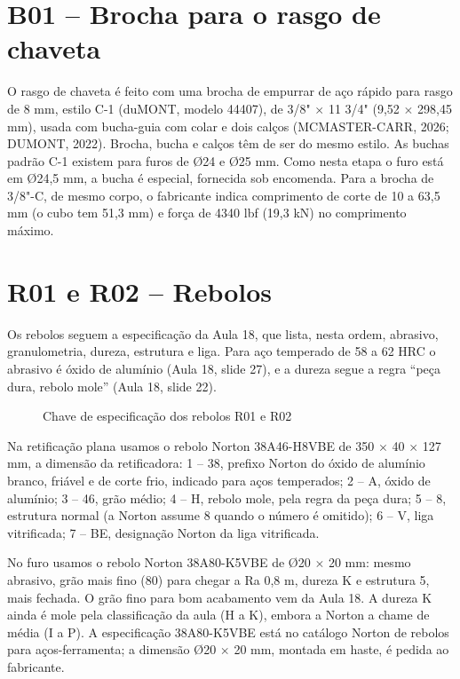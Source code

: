 \section{B01 – Brocha para o rasgo de chaveta}

O rasgo de chaveta é feito com uma brocha de empurrar de aço rápido para rasgo de 8 mm, estilo C-1 (duMONT, modelo 44407), de 3/8" $\times$ 11 3/4" (9,52 $\times$ 298,45 mm), usada com bucha-guia com colar e dois calços (MCMASTER-CARR, 2026; DUMONT, 2022). Brocha, bucha e calços têm de ser do mesmo estilo. As buchas padrão C-1 existem para furos de Ø24 e Ø25 mm. Como nesta etapa o furo está em Ø24,5 mm, a bucha é especial, fornecida sob encomenda. Para a brocha de 3/8"-C, de mesmo corpo, o fabricante indica comprimento de corte de 10 a 63,5 mm (o cubo tem 51,3 mm) e força de 4340 lbf (19,3 kN) no comprimento máximo.

\section{R01 e R02 – Rebolos}

Os rebolos seguem a especificação da Aula 18, que lista, nesta ordem, abrasivo, granulometria, dureza, estrutura e liga. Para aço temperado de 58 a 62 HRC o abrasivo é óxido de alumínio (Aula 18, slide 27), e a dureza segue a regra ``peça dura, rebolo mole'' (Aula 18, slide 22).

\begin{figure}[H]
\centering
\caption{Chave de especificação dos rebolos R01 e R02}\label{fig:chaveR}
\qquad
{}
\end{figure}

\noindent Na retificação plana usamos o rebolo Norton 38A46-H8VBE de 350 $\times$ 40 $\times$ 127 mm, a dimensão da retificadora: 1 – 38, prefixo Norton do óxido de alumínio branco, friável e de corte frio, indicado para aços temperados; 2 – A, óxido de alumínio; 3 – 46, grão médio; 4 – H, rebolo mole, pela regra da peça dura; 5 – 8, estrutura normal (a Norton assume 8 quando o número é omitido); 6 – V, liga vitrificada; 7 – BE, designação Norton da liga vitrificada.

\noindent No furo usamos o rebolo Norton 38A80-K5VBE de Ø20 $\times$ 20 mm: mesmo abrasivo, grão mais fino (80) para chegar a Ra 0,8 \textmu{}m, dureza K e estrutura 5, mais fechada. O grão fino para bom acabamento vem da Aula 18. A dureza K ainda é mole pela classificação da aula (H a K), embora a Norton a chame de média (I a P). A especificação 38A80-K5VBE está no catálogo Norton de rebolos para aços-ferramenta; a dimensão Ø20 $\times$ 20 mm, montada em haste, é pedida ao fabricante.

